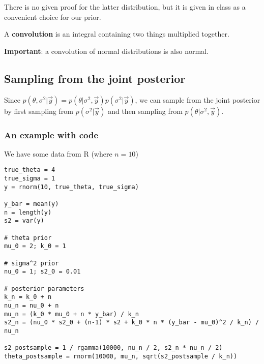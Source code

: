 \documentclass[titlepage, 12pt, leqno]{article}
\begin{document}
\begin{note}
    There is no given proof for the latter distribution, but it is given in
    class as a convenient choice for our prior.
\end{note}

\begin{definition}
    A \textbf{convolution} is an integral containing two things multiplied
    together. 
    \begin{note}
        \textbf{Important}: a convolution of normal distributions is also normal.
    \end{note}
\end{definition}

\subsection{Sampling from the joint posterior}
Since $p(\theta,\sigma^{2}|\vec y) = p(\theta|\sigma^{2},\vec y)p(\sigma^{2}|
\vec y)$, we can sample from the joint posterior by first sampling from
$p(\sigma^{2}|\vec y)$ and then sampling from $p(\theta|\sigma^{2},\vec y)$.

\subsubsection{An example with code}
We have some data from R (where $n = 10$)
\begin{verbatim}
true_theta = 4
true_sigma = 1
y = rnorm(10, true_theta, true_sigma)

y_bar = mean(y)
n = length(y)
s2 = var(y)

# theta prior
mu_0 = 2; k_0 = 1

# sigma^2 prior
nu_0 = 1; s2_0 = 0.01

# posterior parameters
k_n = k_0 + n
nu_n = nu_0 + n
mu_n = (k_0 * mu_0 + n * y_bar) / k_n
s2_n = (nu_0 * s2_0 + (n-1) * s2 + k_0 * n * (y_bar - mu_0)^2 / k_n) / nu_n

s2_postsample = 1 / rgamma(10000, nu_n / 2, s2_n * nu_n / 2)
theta_postsample = rnorm(10000, mu_n, sqrt(s2_postsample / k_n))
\end{verbatim}
\end{document}

